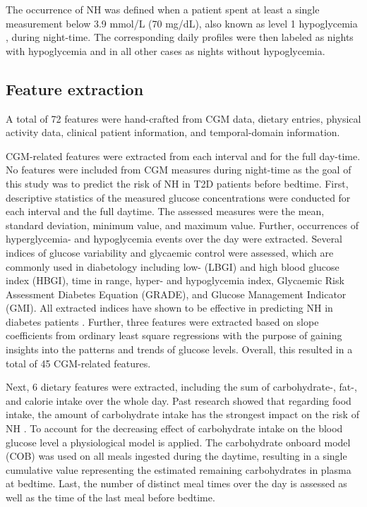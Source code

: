 The occurrence of NH was defined when a patient spent at least a single measurement below 3.9 mmol/L (70 mg/dL), also known as level 1 hypoglycemia \cite{federation2021idf}, during night-time. The corresponding daily profiles were then labeled as nights with hypoglycemia and in all other cases as nights without hypoglycemia. 

\subsection{Feature extraction} \label{Feature extraction}
A total of 72 features were hand-crafted from CGM data, dietary entries, physical activity data, clinical patient information, and temporal-domain information. 

CGM-related features were extracted from each interval and for the full day-time. No features were included from CGM measures during night-time as the goal of this study was to predict the risk of NH in T2D patients before bedtime. First, descriptive statistics of the measured glucose concentrations were conducted for each interval and the full daytime. The assessed measures were the mean, standard deviation, minimum value, and maximum value. Further, occurrences of hyperglycemia- and hypoglycemia events over the day were extracted. Several indices of glucose variability and glycaemic control were assessed, which are commonly used in diabetology \cite{broll2021interpreting} including low- (LBGI) and high blood glucose index (HBGI), time in range, hyper- and hypoglycemia index, Glycaemic Risk Assessment Diabetes Equation (GRADE), and Glucose Management Indicator (GMI). All extracted indices have shown to be effective in predicting NH in diabetes patients \cite{sampath2016glycemic}. Further, three features were extracted based on slope coefficients from ordinary least square regressions with the purpose of gaining insights into the patterns and trends of glucose levels. Overall, this resulted in a total of 45 CGM-related features.

Next, 6 dietary features were extracted, including the sum of carbohydrate-, fat-, and calorie intake over the whole day. Past research showed that regarding food intake, the amount of carbohydrate intake has the strongest impact on the risk of NH \cite{hovorka2004nonlinear, bertachi2020prediction}. To account for the decreasing effect of carbohydrate intake on the blood glucose level a physiological model is applied. The carbohydrate onboard model (COB) \cite{hovorka2004nonlinear} was used on all meals ingested during the daytime, resulting in a single cumulative value representing the estimated remaining carbohydrates in plasma at bedtime. Last, the number of distinct meal times over the day is assessed as well as the time of the last meal before bedtime. 


